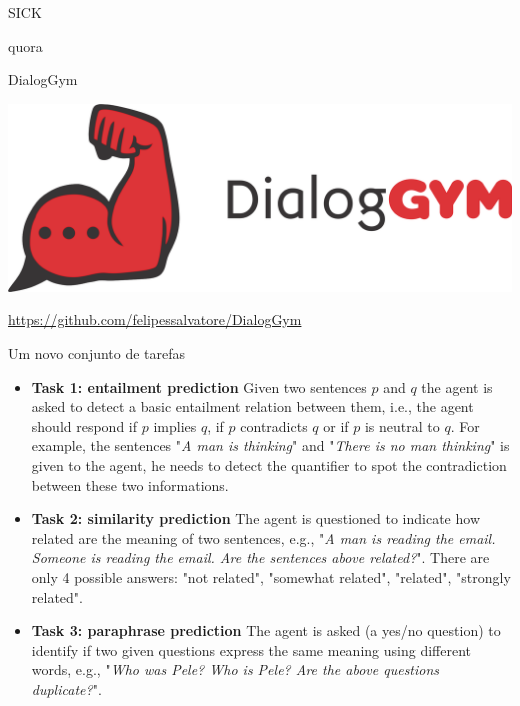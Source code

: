 \documentclass[10pt]{beamer}
\begin{document}
\begin{frame}{SICK}

\end{frame}

\begin{frame}{quora}

\end{frame}


\begin{frame}{DialogGym}

\begin{center}
\includegraphics[scale=0.58]{images/DGred2.png}
\end{center}

\url{https://github.com/felipessalvatore/DialogGym}

\end{frame}


\begin{frame}{Um novo conjunto de tarefas}
\begin{itemize}
\item \textbf{Task 1: entailment prediction} Given two sentences $p$ and $q$ the agent is asked to detect a basic entailment relation between them, i.e., the agent should respond if $p$ implies $q$, if $p$ contradicts $q$ or if $p$ is neutral to $q$. For example, the sentences "\textit{A man is thinking}" and "\textit{There is no man thinking}" is given to the agent, he needs to detect the quantifier to spot the contradiction between these two informations.
\item \textbf{Task 2: similarity prediction} The agent is questioned to indicate how related are the meaning of two sentences, e.g., "\textit{A man is reading the email. Someone is reading the email. Are the sentences above related?}". There are only 4 possible answers: "not related", "somewhat related", "related", "strongly related". 
\item \textbf{Task 3: paraphrase prediction} The agent is asked (a yes/no question) to identify if two given questions express the same meaning using different words, e.g., "\textit{Who was Pele? Who is Pele? Are the above questions duplicate?}".
\end{itemize}
\end{frame}
\end{document}
